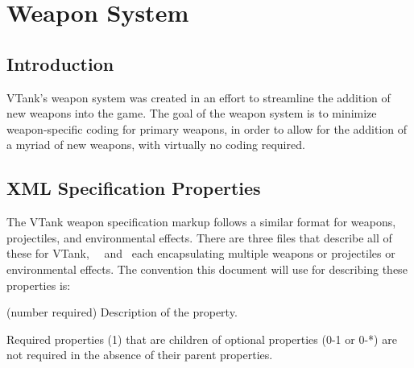 %

\chapter{Weapon System}
\label{Weapon System}

\section{Introduction}
VTank's weapon system was created in an effort to streamline the addition of new weapons into the game.  The goal of the weapon system is to minimize weapon-specific coding for primary weapons, in order to allow for the addition of a myriad of new weapons, with virtually no coding required.  

\section{XML Specification Properties}
The VTank weapon specification markup follows a similar format for weapons, projectiles, and environmental effects.  There are three files that describe all of these for VTank, \WeapProps\, \ProjProps\, and \EnvProps\, each encapsulating multiple weapons or projectiles or environmental effects.  The convention this document will use for describing these properties is:

\begin{description}
\item {} (number required)  Description of the property.
\end{description}

Required properties (1) that are children of optional properties (0-1 or 0-*) are not required in the absence of their parent properties. 

